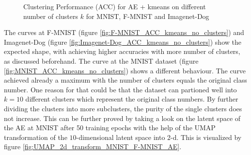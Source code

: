 \documentclass[12pt,DIV14,BCOR12mm,a4paper,footexclude,headinclude,halfparskip-,twoside,openright,cleardoubleempty,idxtotoc,bibtotoc,listtotoc]{scrreprt} %
\numberwithin{equation}{chapter}
\begin{document}
	 \begin{figure}[htb!]
		\centering
		\qquad
		\qquad
		\caption{Clustering Performance (ACC) for AE + kmeans on different number of clusters $k$ for MNIST, F-MNIST and Imagenet-Dog}
		\label{fig:ClusterPerformance_kmeans_no_clusters}
	\end{figure}
The curves at F-MNIST (figure \ref{fig:F-MNIST_ACC_kmeans_no_clusters}) and Imagenet-Dog (figure \ref{fig:Imagenet-Dog_ACC_kmeans_no_clusters}) show the expected shape, with achieving higher accuracies with more number of clusters, as discussed beforehand. The curve at the MNIST dataset (figure \ref{fig:MNIST_ACC_kmeans_no_clusters}) shows a different behaviour. The curve achieved already a maximum with the number of clusters equals the original class number. One reason for that could be that the dataset can partioned well into $k=10$ different clusters which represent the original class numbers. By further dividing the clusters into more subclusters, the purity of the single clusters does not increase. This can be further proved by taking a look on the latent space of the AE at MNIST after 50 training epochs with the help of the UMAP transformation of the $10$-dimensional latent space into $2$-d. This is visualized by figure \ref{fig:UMAP_2d_transform_MNIST_F-MNIST_AE}.
\end{document}
